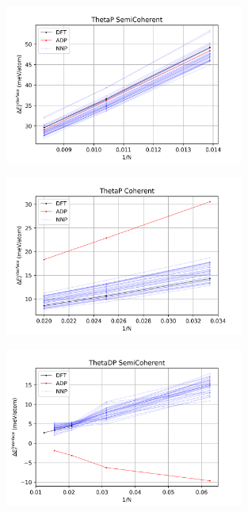 \documentclass{article}
\begin{document}
\begin{figure}[H]%
\centering%
\includegraphics[width=0.7\textwidth,center]{figures/InterfaceSlope_ThetaP_SemiCoherent.png}%
\end{figure}

\begin{figure}[H]%
\centering%
\includegraphics[width=0.7\textwidth,center]{figures/InterfaceSlope_ThetaP_Coherent.png}%
\end{figure}

\begin{figure}[H]%
\centering%
\includegraphics[width=0.7\textwidth,center]{figures/InterfaceSlope_ThetaDP_SemiCoherent.png}%
\end{figure}
\end{document}
